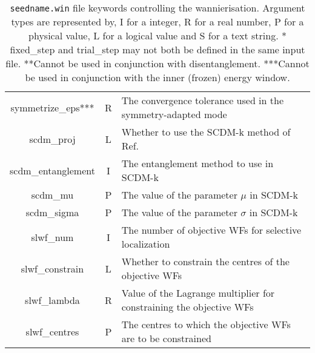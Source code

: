 \begin{table}
\begin{center}
\begin{tabular}{|c|c|p{6cm}|}
{\sc  symmetrize\_eps}***   & R &  The convergence tolerance used in the symmetry-adapted mode \\
{\sc scdm\_proj} & L & Whether to use the SCDM-k method of Ref.~\cite{LinLin-ArXiv2017}  \\
{\sc scdm\_entanglement} & I & The entanglement method to use in SCDM-k \\
{\sc scdm\_mu} & P & The value of the parameter $\mu$ in SCDM-k \\
{\sc scdm\_sigma} & P & The value of the parameter $\sigma$ in SCDM-k \\
{\sc slwf\_num} & I & The number of objective WFs for selective localization \\
{\sc slwf\_constrain} & L & Whether to constrain the centres of the objective WFs \\
{\sc slwf\_lambda} & R & Value of the Lagrange multiplier for constraining the objective WFs \\
{\sc slwf\_centres} & P & The centres to which the objective WFs are to be constrained \\
\hline
\end{tabular}
\caption[Parameter file keywords controlling the Wannierise routine.]
{{\tt seedname.win} file keywords controlling the wannierisation.
  Argument types
are represented by, I for a integer, R for a real number, P for a
physical value, L for a logical value and S for a text string.
{\footnotesize
* {\sc fixed\_step } and  {\sc trial\_step } may not both be defined in
the same input file. **Cannot be used in conjunction with disentanglement.
***Cannot be used in conjunction with the inner (frozen) energy window.}}
\label{parameter_keywords5}
\end{center}
\end{table}



